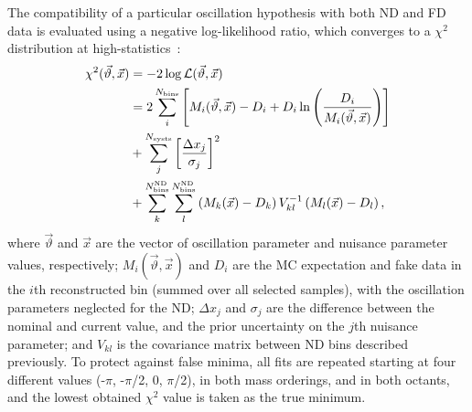 The compatibility of a particular oscillation hypothesis with both ND and FD data is evaluated using a negative log-likelihood ratio, which converges to a $\chi^{2}$ distribution at high-statistics~\cite{Tanabashi:2018oca}:
\begin{equation}
\begin{aligned}
  \chi^2(\vec{\vartheta}, \vec{x}) &= -2\log\mathcal{L}(\vec{\vartheta}, \vec{x}) \\
  &= 2\sum_i^{N_{\rm bins}}\left[ M_i(\vec{\vartheta}, \vec{x})-D_i+D_i\ln\left({D_i\over M_i(\vec{\vartheta}, \vec{x})}\right) \right] \\
  &+ \sum_{j}^{N_{\mathrm{systs}}}\left[ \frac{\Delta x_{j}}{\sigma_{j}} \right]^{2} \\
  &+ \sum^{N^{\mathrm{ND}}_{\mathrm{bins}}}_{k}\sum^{N^{\mathrm{ND}}_{\mathrm{bins}}}_{l} \left(M_k(\vec{x})-D_k \right) V^{-1}_{kl}\left(M_l(\vec{x})-D_l \right),
\end{aligned}
\label{eq:chisq}
\end{equation}
where $\vec{\vartheta}$ and $\vec{x}$ are the vector of oscillation parameter and nuisance parameter values, respectively; $M_i(\vec{\vartheta}, \vec{x})$ and $D_{i}$ are the MC expectation and fake data in the $i$th reconstructed bin (summed over all selected samples), with the oscillation parameters neglected for the ND; $\Delta x_{j}$ and $\sigma_{j}$ are the difference between the nominal and current value, and the prior uncertainty on the $j$th nuisance parameter; and $V_{kl}$ is the covariance matrix between ND bins described previously. To protect against false minima, all fits are repeated starting at four different \deltacp values (-$\pi$, -$\pi$/2, 0, $\pi$/2), in both mass orderings, and in both  octants, and the lowest obtained $\chi^{2}$ value is taken as the true minimum.


